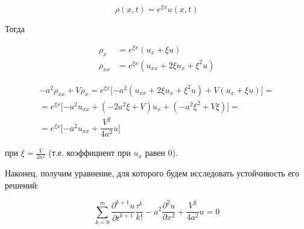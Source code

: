 \begin{equation*}
\rho (x,t) = e^{\xi x} u(x,t)
\end{equation*}

Тогда

\begin{align*}
\rho_x & = e^{\xi x} (u_x + \xi u)\\
\rho_{xx} & = e^{\xi x} (u_{xx} + 2 \xi u_x + \xi^2 u)
\end{align*}

\begin{align*}
- a^2 \rho_{xx} + V \rho_x = e^{\xi x} \lbrack -a^2 (u_{xx} + 2 \xi u_x + \xi^2 u) + V (u_x + \xi u) \rbrack = \\
= e^{\xi x} \lbrack -a^2 u_{xx} + (-2 a^2 \xi + V) u_x + (-a^2 \xi^2 + V \xi) \rbrack = \\
= e^{\xi x} \lbrack -a^2 u_{xx} + \dfrac{V^2}{4a^2} u \rbrack
\end{align*}

при $\xi = \frac{V}{2a^2}$ (т.е. коэффициент при $u_x$ равен $0$).

Наконец, получим уравнение, для которого будем исследовать устойчивость его решений:

\begin{equation}\label{eq:final}
\sum\limits_{k=0}^{m} \dfrac{\partial^{k+1} u}{\partial t^{k+1}} \dfrac{\tau^k}{k!} - a^2 \dfrac{\partial^2 u}{\partial x^2} + \dfrac{V^2}{4a^2} u = 0
\end{equation}